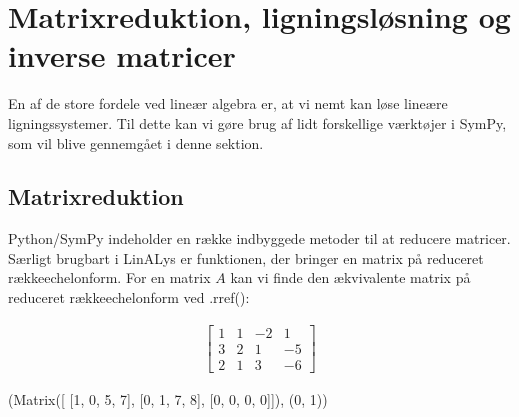 \documentclass[letterpaper,10pt,english]{jupyterBook}
\begin{document}
\section{Matrix\sphinxhyphen{}reduktion, ligningsløsning og inverse matricer}
\label{\detokenize{notebooks/sympy/Notebook_LinAlg1_5:matrix-reduktion-ligningslosning-og-inverse-matricer}}\label{\detokenize{notebooks/sympy/Notebook_LinAlg1_5::doc}}
En af de store fordele ved lineær algebra er, at vi nemt kan løse lineære ligningssystemer. Til dette kan vi gøre brug af lidt forskellige værktøjer i SymPy, som vil blive gennemgået i denne sektion.

\begin{sphinxVerbatim}[commandchars=\\\{\}]
             
       
\end{sphinxVerbatim}


\subsection{Matrix\sphinxhyphen{}reduktion}
\label{\detokenize{notebooks/sympy/Notebook_LinAlg1_5:matrix-reduktion}}
Python/SymPy indeholder en række indbyggede metoder til at reducere matricer. Særligt brugbart i LinALys er funktionen, der bringer en matrix på reduceret række\sphinxhyphen{}echelonform. For en matrix \(A\) kan vi finde den ækvivalente matrix på reduceret række\sphinxhyphen{}echelonform ved .rref():

\begin{sphinxVerbatim}[commandchars=\\\{\}]
  \PYG{p}{[}\PYG{p}{[}   \PYG{p}{]} \PYG{p}{[}   \PYG{p}{]} \PYG{p}{[}   \PYG{p}{]}\PYG{p}{]}
\end{sphinxVerbatim}
\begin{equation*}
\begin{split}\displaystyle \left[\begin{matrix}1 & 1 & -2 & 1\\3 & 2 & 1 & -5\\2 & 1 & 3 & -6\end{matrix}\right]\end{split}
\end{equation*}
\begin{sphinxVerbatim}[commandchars=\\\{\}]
(Matrix([
 [1, 0,  5, \PYGZhy{}7],
 [0, 1, \PYGZhy{}7,  8],
 [0, 0,  0,  0]]),
 (0, 1))
\end{sphinxVerbatim}
\end{document}
